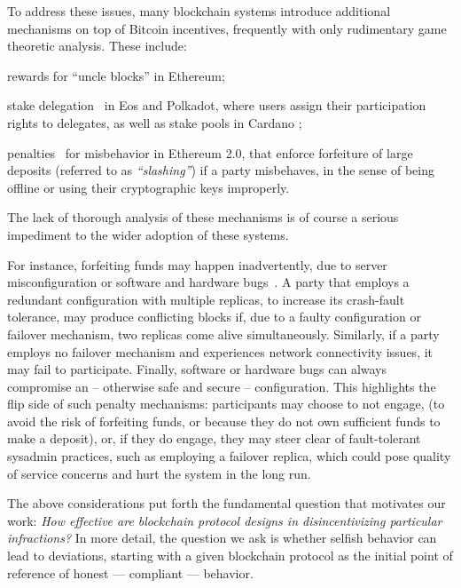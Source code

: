 To address these issues, many blockchain systems introduce additional
mechanisms on top of Bitcoin incentives, frequently with only rudimentary game
theoretic analysis. These include:
\begin{inparaenum}[i)]
    \item rewards for ``uncle blocks'' in Ethereum;
    \item stake delegation~\cite{eosWhitepaper}  in Eos and Polkadot, where
    users assign their participation rights to delegates, as well as stake
    pools in Cardano \cite{SCN:KarKiaLar20};
    \item penalties~\cite{buterin2017casper,casper-incentives} for misbehavior
    in Ethereum 2.0, that enforce forfeiture of large deposits (referred to as
    \emph{``slashing''}) if a party misbehaves, in the sense of being offline
    or using their cryptographic keys improperly.
\end{inparaenum}
The lack of thorough analysis of these mechanisms is of course a serious
impediment to the wider adoption of these systems.

For instance, forfeiting funds may happen inadvertently, due to server
misconfiguration or software and hardware bugs~\cite{khatri2021slashed}.
A party that employs a redundant configuration with multiple replicas, to
increase its crash-fault tolerance, may produce conflicting blocks if, due to a
faulty configuration or failover mechanism, two replicas come alive
simultaneously.  Similarly, if a party employs no failover mechanism and
experiences network connectivity issues, it may fail to participate. Finally,
software or hardware bugs can always compromise an -- otherwise safe and secure
-- configuration.  This highlights the flip side of such penalty mechanisms:
participants may choose to not engage, (\eg to avoid the risk of forfeiting
funds, or because they do not own sufficient funds to make a deposit), or, if
they do engage, they may steer clear of fault-tolerant sysadmin practices, such
as employing a failover replica, which could pose quality of service concerns
and hurt the system in the long run.

The above considerations put forth the fundamental question that motivates our
work: {\em How effective are blockchain protocol designs in disincentivizing
particular infractions?} In more detail, the question we ask is whether selfish
behavior can lead to deviations, starting with a given blockchain protocol as
the initial point of reference of honest --- compliant --- behavior.
